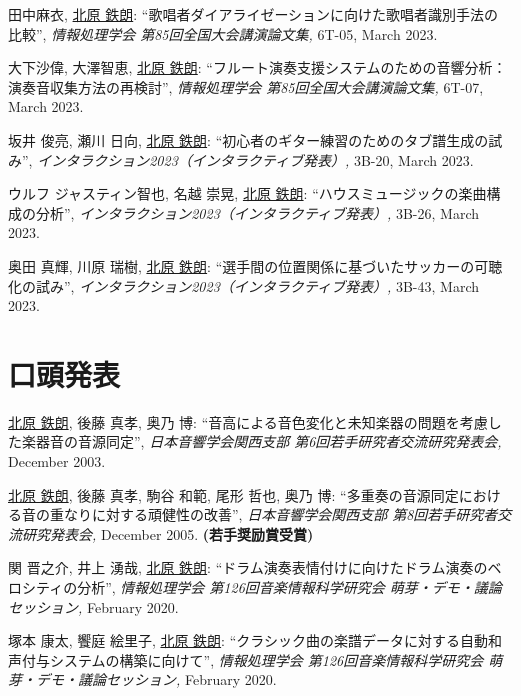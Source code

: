 \begin{Enumerate}
\item 
田中麻衣, 
\underline{北原 鉄朗}: 
    ``歌唱者ダイアライゼーションに向けた歌唱者識別手法の比較'', 
    {\it 情報処理学会 第85回全国大会講演論文集,
    } 6T-05, March 2023. 

\item 
大下沙偉, 
大澤智恵, 
\underline{北原 鉄朗}: 
    ``フルート演奏支援システムのための音響分析：演奏音収集方法の再検討'', 
    {\it 情報処理学会 第85回全国大会講演論文集,
    } 6T-07, March 2023. 

\item 
坂井 俊亮, 
瀬川 日向, 
\underline{北原 鉄朗}: 
    ``初心者のギター練習のためのタブ譜生成の試み'', 
    {\it インタラクション2023（インタラクティブ発表）,
    } 3B-20, March 2023. 

\item 
ウルフ ジャスティン智也, 
名越 崇晃, 
\underline{北原 鉄朗}: 
    ``ハウスミュージックの楽曲構成の分析'', 
    {\it インタラクション2023（インタラクティブ発表）,
    } 3B-26, March 2023. 

\item 
奥田 真輝, 
川原 瑞樹, 
\underline{北原 鉄朗}: 
    ``選手間の位置関係に基づいたサッカーの可聴化の試み'', 
    {\it インタラクション2023（インタラクティブ発表）,
    } 3B-43, March 2023. 

\end{Enumerate}

\section*{口頭発表}
\begin{Enumerate}
  
\item 
\underline{北原 鉄朗}, 
後藤
      真孝, 
奥乃 博: 
    ``音高による音色変化と未知楽器の問題を考慮した楽器音の音源同定'', 
    {\it 日本音響学会関西支部 第6回若手研究者交流研究発表会,
    } December 2003. 

\item 
\underline{北原 鉄朗}, 
後藤
      真孝, 
駒谷
      和範, 
尾形 哲也, 
奥乃 博: 
    ``多重奏の音源同定における音の重なりに対する頑健性の改善'', 
    {\it 日本音響学会関西支部 第8回若手研究者交流研究発表会,
    } December 2005. 
{\bf (若手奨励賞受賞)}
\item 
関 晋之介, 
井上 湧哉, 
\underline{北原 鉄朗}: 
    ``ドラム演奏表情付けに向けたドラム演奏のベロシティの分析'', 
    {\it 情報処理学会 第126回音楽情報科学研究会 萌芽・デモ・議論セッション,
    } February 2020. 

\item 
塚本 康太, 
饗庭 絵里子, 
\underline{北原 鉄朗}: 
    ``クラシック曲の楽譜データに対する自動和声付与システムの構築に向けて'', 
    {\it 情報処理学会 第126回音楽情報科学研究会 萌芽・デモ・議論セッション,
    } February 2020. 

\end{Enumerate}

